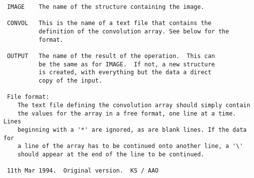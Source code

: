 \begin{description}
\begin{verbatim}
 IMAGE    The name of the structure containing the image.

 CONVOL   This is the name of a text file that contains the
          definition of the convolution array. See below for the
          format.

 OUTPUT   The name of the result of the operation.  This can
          be the same as for IMAGE.  If not, a new structure
          is created, with everything but the data a direct
          copy of the input.

 File format:
    The text file defining the convolution array should simply contain
    the values for the array in a free format, one line at a time. Lines
    beginning with a '*' are ignored, as are blank lines. If the data for
    a line of the array has to be continued onto another line, a '\'
    should appear at the end of the line to be continued.

 11th Mar 1994.  Original version.  KS / AAO
\end{verbatim}
\end{description}
